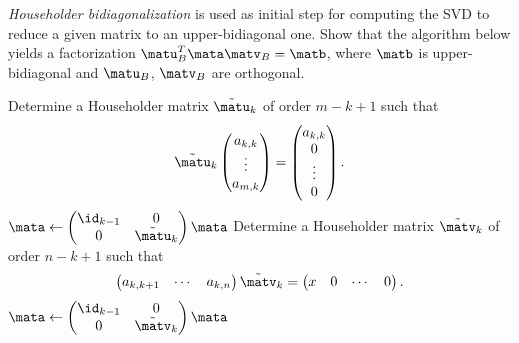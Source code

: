 \begin{Problem}
  \textit{Householder bidiagonalization} is used as initial step for
  computing the SVD to reduce a given matrix to an upper-bidiagonal
  one. Show that the algorithm below yields a factorization
  $\matu_B^T\mata\matv_B=\matb$, where $\matb$ is upper-bidiagonal and
  $\matu_B$, $\matv_B$ are orthogonal.

  \begin{Algorithm}
    \begin{algorithmic}[1]
      \State Determine a Householder matrix $\tilde{\matu}_k$ of
      order $m-k+1$ such that
      \begin{gather*}
        \tilde{\matu}_k
        \begin{pmatrix}
          a_{k,k}\\ \vdots \\ a_{m,k}
        \end{pmatrix}
        =
        \begin{pmatrix}
          a_{k,k}\\ 0\\ \vdots \\ 0
        \end{pmatrix}.
      \end{gather*}
      \State $\mata\gets
      \begin{pmatrix}
        \id_{k-1} & 0\\ 0 & \tilde{\matu}_k
      \end{pmatrix}
      \mata$
      \State Determine a Householder matrix $\tilde{\matv}_k$ of order
      $n-k+1$ such that
      \begin{gather*}
        \begin{pmatrix}
          a_{k,k+1} & \cdots & a_{k,n}
        \end{pmatrix}
        \tilde{\matv}_k = 
        \begin{pmatrix}
          x & 0 & \cdots & 0
        \end{pmatrix}.
      \end{gather*}
      \State $\mata\gets
      \begin{pmatrix}
        \id_{k-1} & 0\\ 0 & \tilde{\matv}_k
      \end{pmatrix}
      \mata$
      \EndIf
      \EndFor
    \end{algorithmic}
  \end{Algorithm}
\end{Problem}
